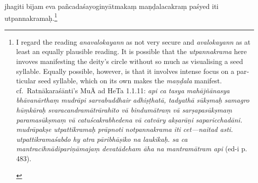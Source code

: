 \documentclass[naipra.tex]{subfiles}
\begin{document}
\begin{sanskrit}
\pstart
jhagiti bījam  eva pañcadaśayoginyātmakaṃ maṇḍalacakraṃ paśyed iti utpannakramaḥ.\footnote{
	\begin{english}%
		I regard the reading \emph{anavalokayann} as not very secure and \emph{avalokayann} as at least an equally plausible reading.
		It is possible that the \emph{utpannakrama} here invoves manifesting the deity's circle without so much as visualising a seed syllable.
		Equally possible, however, is that it involves intense focus on a particular seed syllable, which on its own makes the \emph{maṇḍala} manifest.
		cf.\ Ratnākaraśānti's MuĀ ad HeTa 1.1.11: \emph{api ca tasya mahājñānasya bhāvanārthaṃ mudrāpi sarvabuddhair adhiṣṭhatā, tadyathā sūkṣmaḥ samagro hūṃkāraḥ svaracandramātrārahito vā bindumātraṃ vā sarṣapasūkṣmaṃ paramasūkṣmaṃ vā catuścakrabhedena vā catvāry akṣarāṇi saparicchadāni. mudrāpakṣe utpattikramaḥ prāpnoti notpannakrama iti cet—naitad asti. utpattikramaśabdo hy atra pāribhāṣiko na laukikaḥ. sa ca mantracihnādipariṇāmajaṃ devatādeham āha na mantramātram api} (ed-i p. 483).
	\end{english}
}
\pend



\end{sanskrit}
\end{document}
